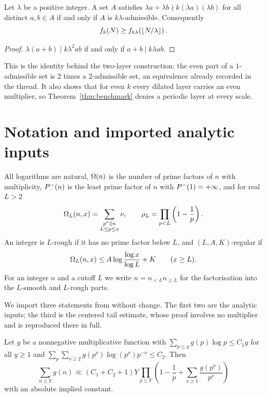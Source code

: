\documentclass[11pt]{article}
\begin{document}
\begin{proposition}\label{prop:dilation}
Let \(\lambda\) be a positive integer. A set \(A\) satisfies
\(\lambda a+\lambda b\nmid k(\lambda a)(\lambda b)\) for all distinct
\(a,b\in A\) if and only if \(A\) is \(k\lambda\)-admissible. Consequently
\[
 f_k(N)\geq f_{k\lambda}\!\left(\left\lfloor N/\lambda\right\rfloor\right).
\]
\end{proposition}

\begin{proof}
\(\lambda(a+b)\mid k\lambda^2ab\) if and only if \(a+b\mid k\lambda ab\).
\end{proof}

This is the identity behind the two-layer construction: the even part of a
\(1\)-admissible set is \(2\) times a \(2\)-admissible set, an equivalence
already recorded in the thread. It also shows that for even \(k\) every
dilated layer carries an even multiplier, so Theorem~\ref{thm:benchmark} denies a
periodic layer at every scale.

\section{Notation and imported analytic inputs}\label{sec:inputs}

All logarithms are natural, \(\Omega(n)\) is the number of prime factors of
\(n\) with multiplicity, \(P^-(n)\) is the least prime factor of \(n\) with
\(P^-(1)=+\infty\), and for real \(L>2\)
\[
 \Omega_L(n,x)=\sum_{\substack{p^\nu\parallel n\\L\leq p\leq x}}\nu,
 \qquad
 \rho_L=\prod_{p<L}\left(1-\frac1p\right).
\]
An integer is \(L\)-rough if it has no prime factor below \(L\), and
\((L,A,K)\)-regular if
\begin{equation}\label{eq:regular}
 \Omega_L(n,x)\leq A\log\frac{\log x}{\log L}+K\qquad(x\geq L).
\end{equation}
For an integer \(n\) and a cutoff \(L\) we write \(n=n_{<L}n_{\geq L}\) for
the factorisation into the \(L\)-smooth and \(L\)-rough parts.

We import three statements from \cite{DellaPietra2026} without change. The
first two are the analytic inputs; the third is the centered tail estimate,
whose proof involves no multiplier and is reproduced there in full.

\begin{proposition}\label{prop:one-variable}
Let \(g\) be a nonnegative multiplicative function with
\(\sum_{p\leq y}g(p)\log p\leq C_1y\) for all \(y\geq1\) and
\(\sum_p\sum_{\nu\geq2}g(p^\nu)\log(p^\nu)p^{-\nu}\leq C_2\). Then
\[
 \sum_{n\leq Y}g(n)\ll(C_1+C_2+1)Y
 \prod_{p\leq Y}\left(1-\frac1p+\sum_{\nu\geq1}\frac{g(p^\nu)}{p^\nu}\right)
\]
with an absolute implied constant.
\end{proposition}
\end{document}
